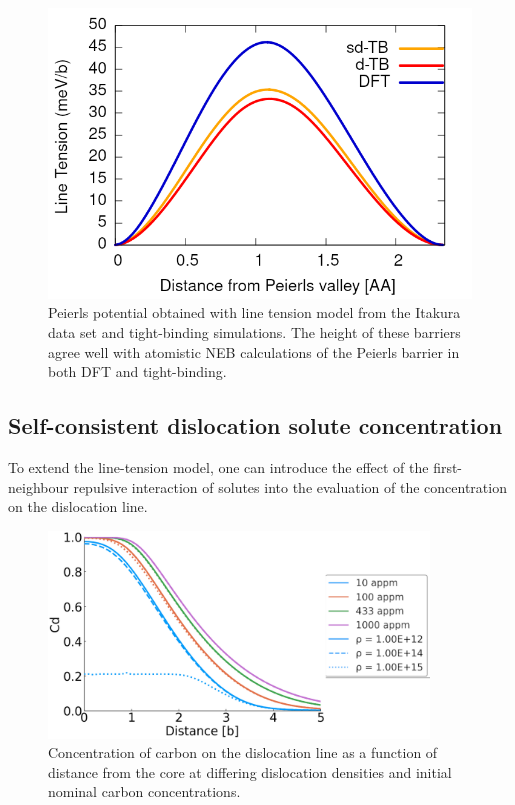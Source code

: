 \documentclass[a4paper,11pt]{article}
\begin{document}
\begin{figure}[htbp]
\centering
\includegraphics[width=.9\linewidth]{Images/fe_peierls_potential_pure.png}
\caption{Peierls potential obtained with line tension model from the Itakura data set and tight-binding simulations. The height of these barriers agree well with atomistic NEB calculations of the Peierls barrier in both DFT and tight-binding.}
\end{figure}


\subsection{Self-consistent dislocation solute concentration}
\label{sec:orge285850}

To extend the line-tension model, one can introduce the effect of the first-neighbour repulsive
interaction of solutes into the evaluation of the concentration on the dislocation line.

\begin{figure}[htbp]

\includegraphics[width=0.9\textwidth]{Images/concentration_vs_solute_distance_all_with_legend_5b.png}
\caption{Concentration of carbon on the dislocation line as a function of distance from the core at differing dislocation densities and initial nominal carbon concentrations. \label{conc_dist_disl}}
\end{figure}
\end{document}
